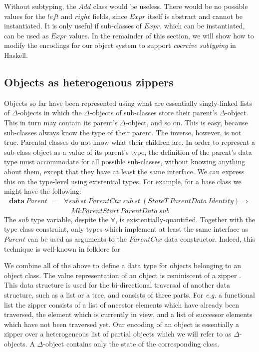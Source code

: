 Without subtyping, the $\mathit{Add}$ class would be useless. There would be no possible values for the $\mathit{left}$ and $\mathit{right}$ fields, since $\mathit{Expr}$ itself is abstract and cannot be instantiated. It is only useful if sub-classes of $\mathit{Expr}$, which can be instantiated, can be used as $\mathit{Expr}$ values. In the remainder of this section, we will show how to modify the encodings for our object system to support \emph{coercive subtyping} in Haskell.

\subsection{Objects as heterogenous zippers}

Objects so far have been represented using what are essentially singly-linked lists of $\Delta$-objects in which the $\Delta$-objects of sub-classes store their parent's $\Delta$-object. This in turn may contain its parent's $\Delta$-object, and so on. This is easy, because sub-classes always know the type of their parent. The inverse, however, is not true. Parental classes do not know what their children are. In order to represent a sub-class object as a value of its parent's type, the definition of the parent's data type must accommodate for all possible sub-classes, without knowing anything about them, except that they have at least the same interface. We can express this on the type-level using existential types. For example, for a base class we might have the following:
\begin{displaymath}
\begin{array}{lcl}
\mathbf{data}~\mathit{Parent} & = & \forall \mathit{sub}~\mathit{st}.\mathit{ParentCtx}~\mathit{sub}~\mathit{st}~(\mathit{StateT}~\mathit{ParentData}~\mathit{Identity}) \Rightarrow \\
&& \quad\mathit{MkParentStart}~\mathit{ParentData}~\mathit{sub}
\end{array}
\end{displaymath}
The $\mathit{sub}$ type variable, despite the $\forall$, is existentially-quantified. Together with the type class constraint, only types which implement at least the same interface as $\mathit{Parent}$ can be used as arguments to the $\mathit{ParentCtx}$ data constructor. Indeed, this technique is well-known in folklore for 

We combine all of the above to define a data type for objects belonging to an object class. The value representation of an object is reminiscent of a zipper \cite{huet1997zipper}. This data structure is used for the bi-directional traversal of another data structure, such as a list or a tree, and consists of three parts. For \emph{e.g.} a functional list the zipper consists of a list of ancestor elements which have already been traversed, the element which is currently in view, and a list of successor elements which have not been traversed yet. Our encoding of an object is essentially a zipper over a heterogeneous list of partial objects which we will refer to as $\Delta$-objects. A $\Delta$-object contains only the state of the corresponding class.

